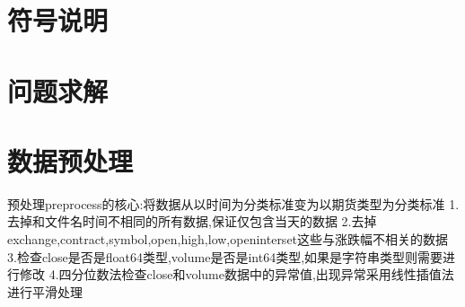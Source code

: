 \documentclass[a4paper,12pt]{ctexart}
\begin{document}
\newpage
\section{符号说明}

\section{问题求解}




\section{数据预处理}
预处理preprocess的核心:将数据从以时间为分类标准变为以期货类型为分类标准
1.去掉和文件名时间不相同的所有数据,保证仅包含当天的数据
2.去掉exchange,contract,symbol,open,high,low,openinterset这些与涨跌幅不相关的数据
3.检查close是否是float64类型,volume是否是int64类型,如果是字符串类型则需要进行修改
4.四分位数法检查close和volume数据中的异常值,出现异常采用线性插值法进行平滑处理
\end{document}
